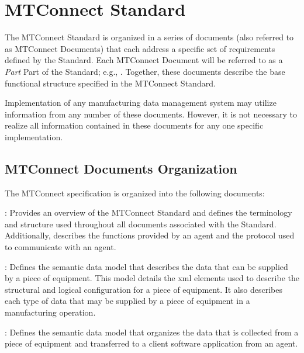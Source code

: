 \documentclass{mtconnect}	%
\providecommand{\DIFadd}[1]{{\hspace{0pt}\protect\color{blue}#1}} %
\providecommand{\DIFdel}[1]{{\hspace{0pt}\protect\color{red}#1}}                      %
\providecommand{\DIFaddbegin}{} %
\providecommand{\DIFaddend}{} %
\providecommand{\DIFdelbegin}{} %
\providecommand{\DIFdelend}{} %
\begin{document}
\printbibliography[title=Other References,notkeyword=MTC]

\nolinenumbers
\glsaddallunused
\nolinenumbers

\linenumbers

\section{MTConnect Standard} 
\label{mtconnect-standard}

The MTConnect Standard is organized in a series of documents (also referred to as MTConnect Documents) that each address a specific set of requirements defined by the Standard.   Each MTConnect Document will be referred to as a \DIFdelbegin \DIFdel{\textit{Part} }\DIFdelend \DIFaddbegin \DIFadd{Part }\DIFaddend of the Standard; e.g., .  Together, these documents describe the \gls{base functional structure} specified in the MTConnect Standard.  

Implementation of any manufacturing data management system may utilize information from any number of these documents.  However, it is not necessary to realize all information contained in these documents for any one specific implementation.

\subsection{MTConnect Documents Organization}

The MTConnect specification is organized into the following documents:

:  Provides an overview of the MTConnect Standard and defines the terminology and structure used throughout all documents associated with the Standard.  Additionally, \cite{MTCPart1} describes the functions provided by an \gls{agent} and the protocol used to communicate with an \gls{agent}.

:  Defines the \gls{semantic data model} that describes the data that can be supplied by a piece of equipment.  This model details the \gls{xml} elements used to describe the structural and logical configuration for a piece of equipment.  It also describes each type of data that may be supplied by a piece of equipment in a manufacturing operation.

:  Defines the \gls{semantic data model} that organizes the data that is collected from a piece of equipment and transferred to a client software application from an \gls{agent}.
\end{document}
